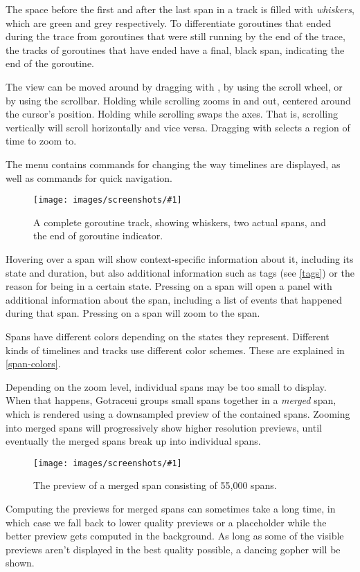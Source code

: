 \documentclass[10pt,letterpaper,oneside,openany,english]{memoir}
\newcommand{\noun}[1]{{\emph{#1}}}
\newcommand{\shortcut}{\ctrl{} or \cmdmac}
\newcommand{\screenshot}[2]{%
\begin{figure}[!ht]
  \centering
  \texttt{[image: images/screenshots/\#1]}
  \caption{#2}
\end{figure}}
\begin{document}
The space before the first and after the last span in a track is filled with \noun{whiskers}, which are green and grey respectively.
To differentiate goroutines that ended during the trace from goroutines that were still running by the end of the trace,
the tracks of goroutines that have ended have a final, black span, indicating the end of the goroutine.

The view can be moved around by dragging with , by using the scroll wheel, or by using the scrollbar.
Holding \keys{\shortcut} while scrolling zooms in and out, centered around the cursor's position.
Holding \keys{\shift} while scrolling swaps the axes. That is, scrolling vertically will scroll horizontally and vice versa.
Dragging with \keys{\shortcut + LMB} selects a region of time to zoom to.

The  menu contains commands for changing the way timelines are displayed,
as well as commands for quick navigation.

\screenshot{track_whiskers_spans_end.png}{A complete goroutine track, showing whiskers, two actual spans, and the end of goroutine indicator.}

Hovering over a span will show context-specific information about it,
including its state and duration,
but also additional information such as tags (see \cref{tags})
or the reason for being in a certain state.
Pressing  on a span will open a panel with additional information about the span, including a list of events that happened during that span.
Pressing \keys{\shortcut + LMB} on a span will zoom to the span.

Spans have different colors depending on the states they represent.
Different kinds of timelines and tracks use different color schemes.
These are explained in \cref{span-colors}.

Depending on the zoom level, individual spans may be too small to display.
When that happens, Gotraceui groups small spans together in a \emph{merged} span,
which is rendered using a downsampled preview of the contained spans.
Zooming into merged spans will progressively show higher resolution previews,
until eventually the merged spans break up into individual spans.

\screenshot{merged-span.png}{The preview of a merged span consisting of 55,000 spans.}

Computing the previews for merged spans can sometimes take a long time,
in which case we fall back to lower quality previews or a placeholder while the better preview gets computed in the background.
As long as some of the visible previews aren't displayed in the best quality possible,
a dancing gopher will be shown.
\end{document}
